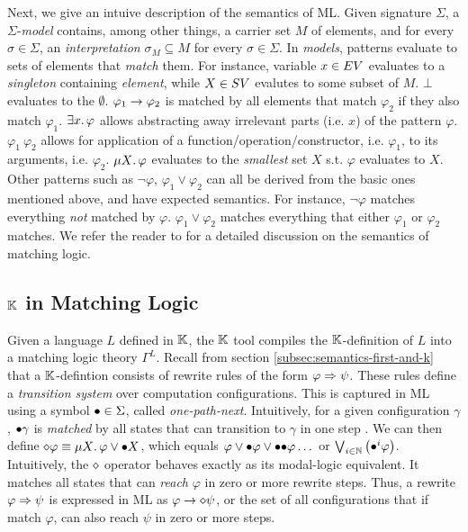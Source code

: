 Next, we give an intuive description of the semantics of ML.
Given signature $\Sigma$, a $\Sigma$-\emph{model} contains, among other things,
a carrier set $M$ of elements, and for every $\sigma \in \Sigma$, an
\emph{interpretation}  $\sigma_{M} \subseteq M$ for every $\sigma \in \Sigma$.
In \emph{models}, patterns evaluate to sets of elements that \emph{match} them.
For instance, variable $x \in EV$ evaluates to a \emph{singleton}
containing \emph{element}, while $X \in SV$ evalutes to some subset of $M$. $\bot$
evaluates to the $\emptyset$.
$\varphi_1 \to \varphi_2$ is matched by all elements that match $\varphi_2$
if they also match $\varphi_1$. $\exists x \mathord{.\,} \varphi$ allows abstracting
away irrelevant parts (i.e. $x$) of the pattern $\varphi$. $\varphi_1\
\varphi_2$ allows for application of a function/operation/constructor,
i.e. $\varphi_1$, to its arguments, i.e. $\varphi_2$. $\mu X \mathord{.\,} \varphi$
evaluates to the \emph{smallest} set $X$ s.t. $\varphi$ evaluates to $X$.
Other patterns such as $\neg \varphi$, $\varphi_1 \vee \varphi_2$ can all be
derived from the basic ones mentioned above, and have expected semantics.
For instance, $\neg \varphi$ matches everything \emph{not} matched by
$\varphi$. $\varphi_1 \vee \varphi_2$ matches everything that either
$\varphi_1$ or $\varphi_2$ matches. We refer the reader to \cite{ChenTR20}
for a detailed discussion on the semantics of matching logic.

\subsection{$\mathbb{K}$ in Matching Logic}

Given a language $L$ defined in $\mathbb{K}$, the $\mathbb{K}$ tool compiles
the $\mathbb{K}$-definition of $L$ into a matching logic theory $\Gamma^L$.
Recall from section \ref{subsec:semantics-first-and-k} that a $\mathbb{K}$-defintion
consists of rewrite rules of the form $\varphi \Rightarrow \psi$. These rules
  define a \emph{transition system} over computation configurations.
This is captured in ML using a symbol ${\bullet} \in \Sigma$, called
\emph{one-path-next}. Intuitively, for a given configuration $\gamma$, ${\bullet}\gamma$
is \emph{matched} by all states that can transition to $\gamma$ in one step \cite{ChenTR20}.
We can then define $\diamond \varphi \equiv \mu X \mathord{.\,} \varphi \lor {\bullet} X$,
  which equals $\varphi \vee {\bullet}\varphi \vee {\bullet}{\bullet}\varphi \dots$ or $\bigvee_{i \in
  \mathbb{N}}\left({\bullet}^{i}\varphi\right)$.
Intuitively, the $\diamond$ operator behaves exactly
as its modal-logic equivalent. It matches all states that can \emph{reach} $\varphi$ in zero or more rewrite steps.
Thus, a rewrite $\varphi \Rightarrow \psi$ is expressed in ML as $\varphi \to \diamond \psi$, or
the set of all configurations that if match $\varphi$, can also reach $\psi$ in zero or more steps.

